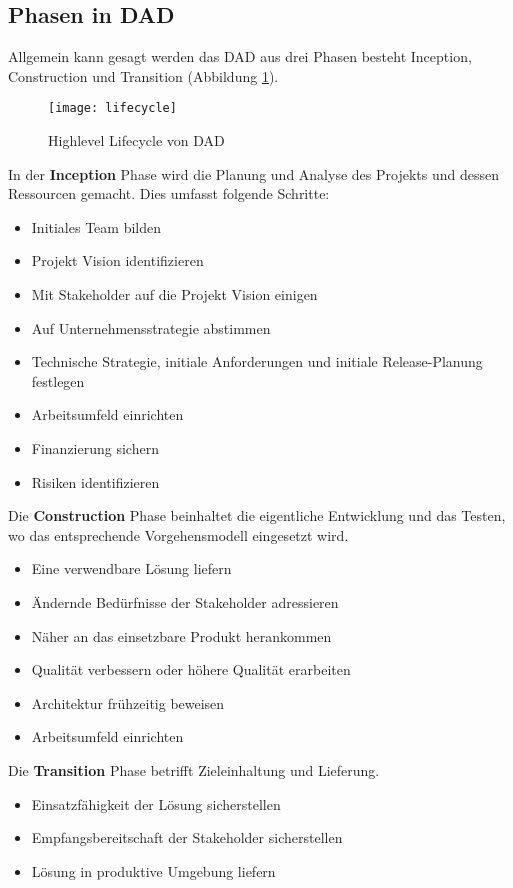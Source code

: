 \subsection{Phasen in DAD}
Allgemein kann gesagt werden das DAD aus drei Phasen besteht Inception, Construction und Transition (Abbildung \ref{fig:highlevellifecycle}). \smallskip
\begin{figure}[H]
	\centering
	\texttt{[image: lifecycle]}
	\caption{Highlevel Lifecycle von DAD\cite{lifecycleDAD}}
	\label{fig:highlevellifecycle}
\end{figure}\medskip
In der \textbf{Inception} Phase wird die Planung und Analyse des Projekts und dessen Ressourcen gemacht. Dies umfasst folgende Schritte:\smallskip
\begin{itemize}
	\item Initiales Team bilden
	\item Projekt Vision identifizieren
	\item Mit Stakeholder auf die Projekt Vision einigen
	\item Auf Unternehmensstrategie abstimmen
	\item Technische Strategie, initiale Anforderungen und initiale Release-Planung festlegen
	\item Arbeitsumfeld einrichten
	\item Finanzierung sichern
	\item Risiken identifizieren
\end{itemize}
\medskip
Die \textbf{Construction} Phase beinhaltet die eigentliche Entwicklung und das Testen, wo das entsprechende Vorgehensmodell eingesetzt wird.\smallskip
\begin{itemize}
	\item Eine verwendbare Lösung liefern
	\item Ändernde Bedürfnisse der Stakeholder adressieren 
	\item Näher an das einsetzbare Produkt herankommen
	\item Qualität verbessern oder höhere Qualität erarbeiten
	\item Architektur frühzeitig beweisen
	\item Arbeitsumfeld einrichten
\end{itemize}\medskip
Die \textbf{Transition} Phase betrifft Zieleinhaltung und Lieferung.
\begin{itemize}
	\item Einsatzfähigkeit der Lösung sicherstellen
	\item Empfangsbereitschaft der Stakeholder sicherstellen
	\item Lösung in produktive Umgebung liefern
\end{itemize}
\medskip

